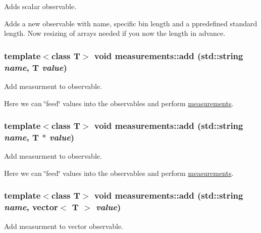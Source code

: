 Adds scalar observable. 

Adds a new observable with name, specific bin length and a ppredefined standard length. Now resizing of arrays needed if you now the length in advance. \hypertarget{classmeasurements_e1ac4a3f40e78a0e2e8b71208d4d1313}{
\subsubsection[add]{\setlength{\rightskip}{0pt plus 5cm}template$<$class T$>$ void measurements::add (std::string {\em name}, \/  T {\em value})}}
\label{classmeasurements_e1ac4a3f40e78a0e2e8b71208d4d1313}


Add measurment to observable. 

Here we can \char`\"{}feed\char`\"{} values into the observables and perform \hyperlink{classmeasurements}{measurements}. \hypertarget{classmeasurements_c2a7e804a30825d77c111892ead6fc2c}{
\subsubsection[add]{\setlength{\rightskip}{0pt plus 5cm}template$<$class T$>$ void measurements::add (std::string {\em name}, \/  T $\ast$ {\em value})}}
\label{classmeasurements_c2a7e804a30825d77c111892ead6fc2c}


Add measurment to observable. 

Here we can \char`\"{}feed\char`\"{} values into the observables and perform \hyperlink{classmeasurements}{measurements}. \hypertarget{classmeasurements_425cb494200db7a39e99f37dfdfa23bc}{
\subsubsection[add]{\setlength{\rightskip}{0pt plus 5cm}template$<$class T$>$ void measurements::add (std::string {\em name}, \/  vector$<$ T $>$ {\em value})}}
\label{classmeasurements_425cb494200db7a39e99f37dfdfa23bc}


Add measurment to vector observable. 


